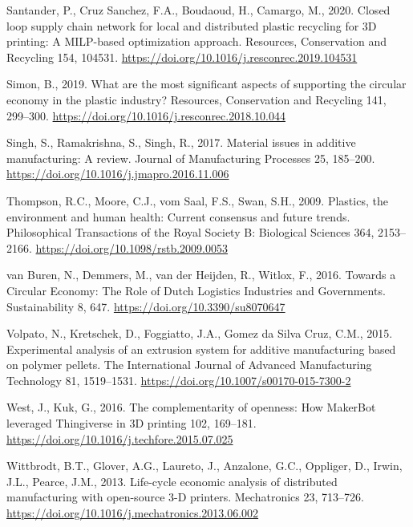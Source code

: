 \documentclass[
  11pt,
]{article}
\newlength{\cslhangindent}
\newlength{\cslentryspacingunit} %
\newenvironment{CSLReferences}[2] %
 {%
  \setlength{\parindent}{0pt}
  \ifodd #1
  \let\oldpar\par
  \def\par{\hangindent=\cslhangindent\oldpar}
  \fi
  \setlength{\parskip}{#2\cslentryspacingunit}
 }%
 {}
\begin{document}
\begin{CSLReferences}{1}{0}
\leavevmode{}%
Santander, P., Cruz Sanchez, F.A., Boudaoud, H., Camargo, M., 2020.
Closed loop supply chain network for local and distributed plastic
recycling for {3D} printing: A {MILP-based} optimization approach.
Resources, Conservation and Recycling 154, 104531.
\url{https://doi.org/10.1016/j.resconrec.2019.104531}

\leavevmode{}%
Simon, B., 2019. What are the most significant aspects of supporting the
circular economy in the plastic industry? Resources, Conservation and
Recycling 141, 299--300.
\url{https://doi.org/10.1016/j.resconrec.2018.10.044}

\leavevmode{}%
Singh, S., Ramakrishna, S., Singh, R., 2017. Material issues in additive
manufacturing: {A} review. Journal of Manufacturing Processes 25,
185--200. \url{https://doi.org/10.1016/j.jmapro.2016.11.006}

\leavevmode{}%
Thompson, R.C., Moore, C.J., vom Saal, F.S., Swan, S.H., 2009. Plastics,
the environment and human health: Current consensus and future trends.
Philosophical Transactions of the Royal Society B: Biological Sciences
364, 2153--2166. \url{https://doi.org/10.1098/rstb.2009.0053}

\leavevmode{}%
van Buren, N., Demmers, M., van der Heijden, R., Witlox, F., 2016.
Towards a {Circular Economy}: {The Role} of {Dutch Logistics Industries}
and {Governments}. Sustainability 8, 647.
\url{https://doi.org/10.3390/su8070647}

\leavevmode{}%
Volpato, N., Kretschek, D., Foggiatto, J.A., Gomez da Silva Cruz, C.M.,
2015. Experimental analysis of an extrusion system for additive
manufacturing based on polymer pellets. The International Journal of
Advanced Manufacturing Technology 81, 1519--1531.
\url{https://doi.org/10.1007/s00170-015-7300-2}

\leavevmode{}%
West, J., Kuk, G., 2016. The complementarity of openness: {How MakerBot}
leveraged {Thingiverse} in {3D} printing 102, 169--181.
\url{https://doi.org/10.1016/j.techfore.2015.07.025}

\leavevmode{}%
Wittbrodt, B.T., Glover, A.G., Laureto, J., Anzalone, G.C., Oppliger,
D., Irwin, J.L., Pearce, J.M., 2013. Life-cycle economic analysis of
distributed manufacturing with open-source 3-{D} printers. Mechatronics
23, 713--726. \url{https://doi.org/10.1016/j.mechatronics.2013.06.002}


\end{CSLReferences}
\end{document}
